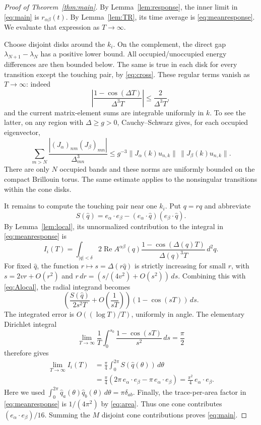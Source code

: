 \documentclass[11pt,a4paper]{article}
\DeclareMathOperator{\RePart}{Re}
\begin{document}
\begin{proof}[Proof of Theorem~\ref{thm:main}]
By Lemma~\ref{lem:response}, the inner limit in \eqref{eq:main} is
$r_{\alpha\beta}(t)$. By Lemma~\ref{lem:TR}, its time average is
\eqref{eq:meanresponse}. We evaluate that expression as $T\to\infty$.

Choose disjoint disks around the $k_i$. On the complement, the direct gap
$\lambda_{N+1}-\lambda_N$ has a positive lower bound. All occupied/unoccupied
energy differences are then bounded below. The same is true in each disk for
every transition except the touching pair, by \eqref{eq:cross}. These regular
terms vanish as $T\to\infty$: indeed
\[
 \left|\frac{1-\cos(\Delta T)}{\Delta^3T}\right|
 \leq\frac{2}{\Delta^3T},
\]
and the current matrix-element sums are integrable uniformly in $k$. To see
the latter, on any region with $\Delta\geq g>0$, Cauchy--Schwarz gives, for
each occupied eigenvector,
\[
 \sum_{m>N}\frac{|(J_\alpha)_{nm}(J_\beta)_{mn}|}{\Delta_{mn}^3}
 \leq g^{-3}\|J_\alpha(k)u_{n,k}\|\,
                    \|J_\beta(k)u_{n,k}\|.
\]
There are only $N$ occupied bands and these norms are uniformly bounded on
the compact Brillouin torus. The same estimate applies to the nonsingular
transitions within the cone disks.

It remains to compute the touching pair near one $k_i$. Put
$q=r\widehat q$ and abbreviate
\[
 S(\widehat q)=e_\alpha\cdot e_\beta
 -(e_\alpha\cdot\widehat q)(e_\beta\cdot\widehat q).
\]
By Lemma~\ref{lem:local}, its unnormalized contribution to the integral in
\eqref{eq:meanresponse} is
\[
 I_i(T)=\int_{|q|<\delta}
 2\RePart A^{\alpha\beta}(q)
 \frac{1-\cos(\Delta(q)T)}{\Delta(q)^3T}\,d^2q.
\]
For fixed $\widehat q$, the function $r\mapsto s=\Delta(r\widehat q)$ is
strictly increasing for small $r$, with
$s=2vr+O(r^2)$ and $r\,dr=(s/(4v^2)+O(s^2))\,ds$. Combining this with
\eqref{eq:Alocal}, the radial integrand becomes
\[
 \left(\frac{S(\widehat q)}{2s^2T}+O\!\left(\frac1{sT}\right)\right)
 (1-\cos(sT))\,ds.
\]
The integrated error is $O((\log T)/T)$, uniformly in angle. The elementary
Dirichlet integral
\[
 \lim_{T\to\infty}\frac1T\int_0^{s_0}
       \frac{1-\cos(sT)}{s^2}\,ds=\frac\pi2
\]
therefore gives
\begin{align*}
 \lim_{T\to\infty} I_i(T)
 &=\frac\pi4\int_0^{2\pi}S(\widehat q(\theta))\,d\theta\\
 &=\frac\pi4\left(2\pi\,e_\alpha\cdot e_\beta
       -\pi\,e_\alpha\cdot e_\beta\right)
 =\frac{\pi^2}{4}\,e_\alpha\cdot e_\beta.
\end{align*}
Here we used
$\int_0^{2\pi}\widehat q_a(\theta)\widehat q_b(\theta)\,d\theta
=\pi\delta_{ab}$. Finally, the trace-per-area factor in
\eqref{eq:meanresponse} is $1/(4\pi^2)$ by \eqref{eq:area}. Thus one cone
contributes $(e_\alpha\cdot e_\beta)/16$. Summing the $M$ disjoint cone
contributions proves \eqref{eq:main}.
\end{proof}
\end{document}
